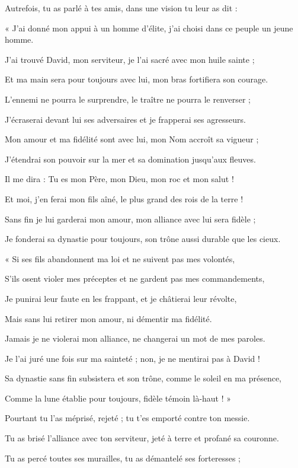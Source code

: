 \item Autrefois, tu as parlé à tes amis, dans une vision tu leur as dit : 
\item « J'ai donné mon appui à un homme d'élite, j'ai choisi dans ce peuple un jeune homme.
\item J'ai trouvé David, mon serviteur, je l'ai sacré avec mon huile sainte ;
\item Et ma main sera pour toujours avec lui, mon bras fortifiera son courage.
\item L'ennemi ne pourra le surprendre, le traître ne pourra le renverser ;
\item J'écraserai devant lui ses adversaires et je frapperai ses agresseurs.
\item Mon amour et ma fidélité sont avec lui, mon Nom accroît sa vigueur ;
\item J'étendrai son pouvoir sur la mer et sa domination jusqu'aux fleuves.
\item Il me dira : Tu es mon Père, mon Dieu, mon roc et mon salut !
\item Et moi, j'en ferai mon fils aîné, le plus grand des rois de la terre !
\item Sans fin je lui garderai mon amour, mon alliance avec lui sera fidèle ;
\item Je fonderai sa dynastie pour toujours, son trône aussi durable que les cieux.
\item « Si ses fils abandonnent ma loi et ne suivent pas mes volontés,
\item S'ils osent violer mes préceptes et ne gardent pas mes commandements,
\item Je punirai leur faute en les frappant, et je châtierai leur révolte,
\item Mais sans lui retirer mon amour, ni démentir ma fidélité.
\item Jamais je ne violerai mon alliance, ne changerai un mot de mes paroles.
\item Je l'ai juré une fois sur ma sainteté ; non, je ne mentirai pas à David !
\item Sa dynastie sans fin subsistera et son trône, comme le soleil en ma présence,
\item Comme la lune établie pour toujours, fidèle témoin là-haut ! »
\item Pourtant tu l'as méprisé, rejeté ; tu t'es emporté contre ton messie.
\item Tu as brisé l'alliance avec ton serviteur, jeté à terre et profané sa couronne.
\item Tu as percé toutes ses murailles, tu as démantelé ses forteresses ;
